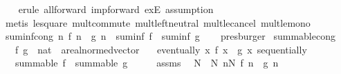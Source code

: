 \begin{isabellebody}
\ \ \isamarkupfalse%
\ {\isacharparenleft}{\kern0pt}erule\ all{\isacharunderscore}{\kern0pt}forward\ imp{\isacharunderscore}{\kern0pt}forward\ exE{\isacharbar}{\kern0pt}\ assumption{\isacharparenright}{\kern0pt}{\isacharplus}{\kern0pt}\isanewline
\ \ \isamarkupfalse%
\ {\isacharparenleft}{\kern0pt}metis\ le{\isacharunderscore}{\kern0pt}square\ mult{\isachardot}{\kern0pt}commute\ mult{\isachardot}{\kern0pt}left{\isacharunderscore}{\kern0pt}neutral\ mult{\isacharunderscore}{\kern0pt}le{\isacharunderscore}{\kern0pt}cancel{}\ mult{\isacharunderscore}{\kern0pt}le{\isacharunderscore}{\kern0pt}mono{\isacharparenright}{\kern0pt}%
\endisatagproof
{\isafoldproof}%
%
\isadelimproof
\isanewline
%
\endisadelimproof
\isanewline
{}\isamarkupfalse%
\ suminf{\isacharunderscore}{\kern0pt}cong{\isacharcolon}{\kern0pt}\ {\isachardoublequoteopen}{\isacharparenleft}{\kern0pt}{\isasymAnd}n{\isachardot}{\kern0pt}\ f\ n\ {\isacharequal}{\kern0pt}\ g\ n{\isacharparenright}{\kern0pt}\ {\isasymLongrightarrow}\ suminf\ f\ {\isacharequal}{\kern0pt}\ suminf\ g{\isachardoublequoteclose}\isanewline
%
\isadelimproof
\ \ %
\endisadelimproof
%
\isatagproof
{}\isamarkupfalse%
\ presburger%
\endisatagproof
{\isafoldproof}%
%
\isadelimproof
\isanewline
%
\endisadelimproof
\isanewline
{}\isamarkupfalse%
\ summable{\isacharunderscore}{\kern0pt}cong{\isacharcolon}{\kern0pt}\isanewline
\ \ \ f\ g\ {\isacharcolon}{\kern0pt}{\isacharcolon}{\kern0pt}\ {\isachardoublequoteopen}nat\ {\isasymRightarrow}\ {\isacharprime}{\kern0pt}a{\isacharcolon}{\kern0pt}{\isacharcolon}{\kern0pt}real{\isacharunderscore}{\kern0pt}normed{\isacharunderscore}{\kern0pt}vector{\isachardoublequoteclose}\isanewline
\ \ \ {\isachardoublequoteopen}eventually\ {\isacharparenleft}{\kern0pt}{\isasymlambda}x{\isachardot}{\kern0pt}\ f\ x\ {\isacharequal}{\kern0pt}\ g\ x{\isacharparenright}{\kern0pt}\ sequentially{\isachardoublequoteclose}\isanewline
\ \ \ {\isachardoublequoteopen}summable\ f\ {\isacharequal}{\kern0pt}\ summable\ g{\isachardoublequoteclose}\isanewline
%
\isadelimproof
%
\endisadelimproof
%
\isatagproof
{}\isamarkupfalse%
\ {\isacharminus}{\kern0pt}\isanewline
\ \ \isamarkupfalse%
\ assms\ \isamarkupfalse%
\ N\ \ N{\isacharcolon}{\kern0pt}\ {\isachardoublequoteopen}{\isasymforall}n{\isasymge}N{\isachardot}{\kern0pt}\ f\ n\ {\isacharequal}{\kern0pt}\ g\ n{\isachardoublequoteclose}\isanewline
\ \ \ \ \isamarkupfalse%

\end{isabellebody}

